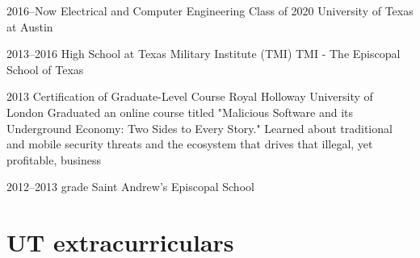 \documentclass[]{friggeri-cv} %
\begin{document}
\begin{entrylist}

	\vspace{-10pt}
	\entry
	{2016--Now}
	{Electrical and Computer Engineering Class of 2020}
	{University of Texas at Austin}


	\vspace{-10pt}
	\entry
	{2013--2016}
	{High School at Texas Military Institute (TMI)}
	{TMI - The Episcopal School of Texas}


	\entry
	{2013}
	{Certification of Graduate-Level Course}
	{Royal Holloway University of London}
	{Graduated an online course titled "Malicious Software and its Underground Economy: Two Sides to Every Story." Learned about traditional and mobile security threats and the ecosystem that drives that illegal, yet profitable, business}


	\vspace{-10pt}
	\entry
	{2012--2013}
	{ grade}
	{Saint Andrew's Episcopal School}

\end{entrylist}

\section{UT extracurriculars}
\end{document}
